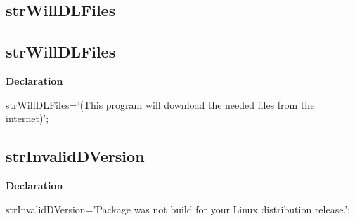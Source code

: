 \documentclass{report}
\newif\ifpdf
\begin{document}
\subsection*{\large{\textbf{strWillDLFiles}}\normalsize\hspace{1ex}\hrulefill}
\else
\subsection*{strWillDLFiles}
\fi
\label{trstrings-strWillDLFiles}
\begin{list}{}{
\setlength{\itemindent}{0cm}
\setlength{\listparindent}{0cm}
\setlength{\leftmargin}{\evensidemargin}
\addtolength{\leftmargin}{\tmplength}
\settowidth{\labelsep}{X}
\addtolength{\leftmargin}{\labelsep}
\setlength{\labelwidth}{\tmplength}
}
\item[\textbf{Declaration}\hfill]
\ifpdf
\begin{flushleft}
\fi
\begin{ttfamily}
strWillDLFiles='(This program will download the needed files from the internet)';\end{ttfamily}

\ifpdf
\end{flushleft}
\fi

\end{list}
\ifpdf
\subsection*{\large{\textbf{strInvalidDVersion}}\normalsize\hspace{1ex}\hrulefill}
\else
\subsection*{strInvalidDVersion}
\fi
\label{trstrings-strInvalidDVersion}
\begin{list}{}{
\setlength{\itemindent}{0cm}
\setlength{\listparindent}{0cm}
\setlength{\leftmargin}{\evensidemargin}
\addtolength{\leftmargin}{\tmplength}
\settowidth{\labelsep}{X}
\addtolength{\leftmargin}{\labelsep}
\setlength{\labelwidth}{\tmplength}
}
\item[\textbf{Declaration}\hfill]
\ifpdf
\begin{flushleft}
\fi
\begin{ttfamily}
strInvalidDVersion='Package was not build for your Linux distribution release.';\end{ttfamily}

\ifpdf
\end{flushleft}
\fi

\end{list}
\ifpdf
\end{document}
